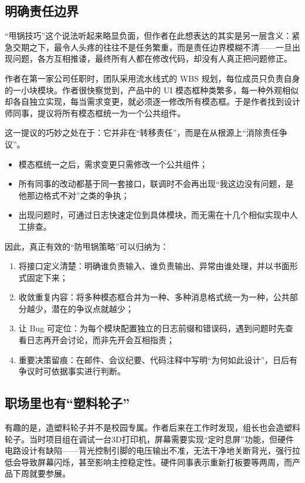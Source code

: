 \subsection{明确责任边界}

“甩锅技巧”这个说法听起来略显负面，但作者在此想表达的其实是另一层含义：紧急交期之下，最令人头疼的往往不是任务繁重，而是责任边界模糊不清——一旦出现问题，各方互相推诿，最终所有人都在修改代码，却没有人真正把问题修正。

作者在第一家公司任职时，团队采用流水线式的 WBS 规划，每位成员只负责自身的一小块模块。作者很快察觉到，产品中的 UI 模态框种类繁多，每一种外观相似却各自独立实现，每当需求变更，就必须逐一修改所有模态框。于是作者找到设计师同事，提议将所有模态框统一为一个公共组件。

这一提议的巧妙之处在于：它并非在“转移责任”，而是在从根源上“消除责任争议”。

\begin{itemize}
	\item 模态框统一之后，需求变更只需修改一个公共组件；
	\item 所有同事的改动都基于同一套接口，联调时不会再出现“我这边没有问题，是他那边格式不对”之类的争执；
	\item 出现问题时，可通过日志快速定位到具体模块，而无需在十几个相似实现中人工排查。
\end{itemize}

因此，真正有效的“防甩锅策略”可以归纳为：

\begin{enumerate}
	\item 将接口定义清楚：明确谁负责输入、谁负责输出、异常由谁处理，并以书面形式固定下来；
	\item 收敛重复内容：将多种模态框合并为一种、多种消息格式统一为一种，公共部分越少，潜在的争议点就越少；
	\item 让 Bug 可定位：为每个模块配置独立的日志前缀和错误码，遇到问题时先查看日志再开会讨论，而非先开会互相指责；
	\item 重要决策留痕：在邮件、会议纪要、代码注释中写明“为何如此设计”，日后有争议时可依据事实进行判断。
\end{enumerate}

\subsection{职场里也有“塑料轮子”}

有趣的是，造塑料轮子并不是校园专属。作者后来在工作时发现，组长也会造塑料轮子。当时项目组在调试一台3D打印机，屏幕需要实现“定时息屏”功能，但硬件电路设计有缺陷——背光控制引脚的电压输出不准，无法干净地关断背光，强行拉低会导致屏幕闪烁，甚至影响主控稳定性。硬件同事表示重新打板要等两周，而产品下周就要参展。

